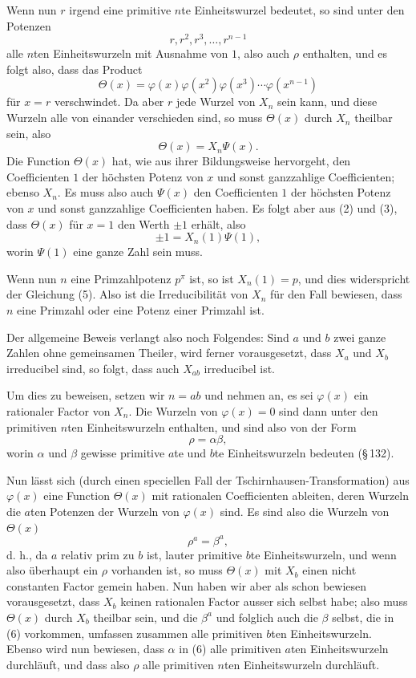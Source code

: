 \documentclass[11pt]{article}
\begin{document}
Wenn nun $r$ irgend eine primitive $n$te Einheitswurzel bedeutet, so sind unter den Potenzen
\[
        r,r^2,r^3,\ldots,r^{n-1}
\]
alle $n$ten Einheitswurzeln mit Ausnahme von $1$, also auch $\rho$ enthalten, und es folgt also, dass das Product
\[
\tag{3}        \Theta(x)=\varphi(x)\varphi(x^2)\varphi(x^3)\cdots\varphi(x^{n-1})
\]
für $x=r$ verschwindet. Da aber $r$ jede Wurzel von $X_n$ sein kann, und diese Wurzeln alle von einander verschieden sind, so muss $\Theta(x)$ durch $X_n$ theilbar sein, also
\[
\tag{4}        \Theta(x)=X_n\Psi(x).
\]
Die Function $\Theta(x)$ hat, wie aus ihrer Bildungsweise hervorgeht, den Coefficienten $1$ der höchsten Potenz von $x$ und sonst ganzzahlige Coefficienten; ebenso $X_n$. Es muss also auch $\Psi(x)$ den Coefficienten $1$ der höchsten Potenz von $x$ und sonst ganzzahlige Coefficienten haben. Es folgt aber aus (2) und (3), dass $\Theta(x)$ für $x=1$ den Werth $\pm1$ erhält, also
\[
\tag{5}        \pm1=X_n(1)\Psi(1),
\]
worin $\Psi(1)$ eine ganze Zahl sein muss.

Wenn nun $n$ eine Primzahlpotenz $p^\pi$ ist, so ist $X_n(1)=p$, und dies widerspricht der Gleichung (5). Also ist die Irreducibilität von $X_n$ für den Fall bewiesen, dass $n$ eine Primzahl oder eine Potenz einer Primzahl ist.

Der allgemeine Beweis verlangt also noch Folgendes: Sind $a$ und $b$ zwei ganze Zahlen ohne gemeinsamen Theiler, wird ferner vorausgesetzt, dass $X_a$ und $X_b$ irreducibel sind, so folgt, dass auch $X_{ab}$ irreducibel ist.

Um dies zu beweisen, setzen wir $n=ab$ und nehmen an, es sei $\varphi(x)$ ein rationaler Factor von $X_n$. Die Wurzeln von $\varphi(x)=0$ sind dann unter den primitiven $n$ten Einheitswurzeln enthalten, und sind also von der Form
\[
\tag{6}        \rho=\alpha\beta,
\]
worin $\alpha$ und $\beta$ gewisse primitive $a$te und $b$te Einheitswurzeln bedeuten (\S\,132).

Nun lässt sich (durch einen speciellen Fall der Tschirnhausen-Transformation) aus $\varphi(x)$ eine Function $\Theta(x)$ mit rationalen Coefficienten ableiten, deren Wurzeln die $a$ten Potenzen der Wurzeln von $\varphi(x)$ sind. Es sind also die Wurzeln von $\Theta(x)$
\[
        \rho^a=\beta^a,
\]
d. h., da $a$ relativ prim zu $b$ ist, lauter primitive $b$te Einheitswurzeln, und wenn also überhaupt ein $\rho$ vorhanden ist, so muss $\Theta(x)$ mit $X_b$ einen nicht constanten Factor gemein haben. Nun haben wir aber als schon bewiesen vorausgesetzt, dass $X_b$ keinen rationalen Factor ausser sich selbst habe; also muss $\Theta(x)$ durch $X_b$ theilbar sein, und die $\beta^a$ und folglich auch die $\beta$ selbst, die in (6) vorkommen, umfassen zusammen alle primitiven $b$ten Einheitswurzeln. Ebenso wird nun bewiesen, dass $\alpha$ in (6) alle primitiven $a$ten Einheitswurzeln durchläuft, und dass also $\rho$ alle primitiven $n$ten Einheitswurzeln durchläuft.
\end{document}
